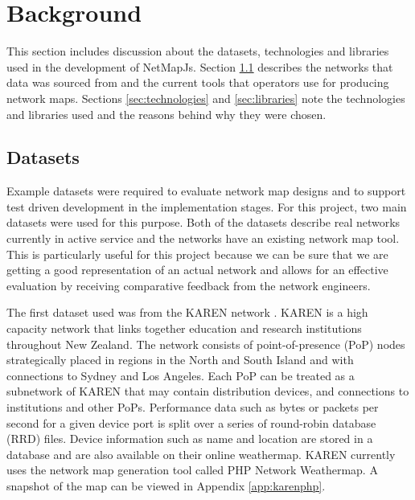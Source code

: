 \documentclass[11pt, a4paper]{article}
\begin{document}
\newpage

\section{Background}
\label{sec:background}

This section includes discussion about the datasets, technologies and libraries
used in the development of NetMapJs. Section \ref{sec:datasets} describes the
networks that data was sourced from and the current tools that operators use for
producing network maps. Sections \ref{sec:technologies} and \ref{sec:libraries}
note the technologies and libraries used and the reasons behind why they were
chosen.

\subsection{Datasets}
\label{sec:datasets}

Example datasets were required to evaluate network map designs and to support
test driven development in the implementation stages. For this project, two main
datasets were used for this purpose. Both of the datasets describe real networks
currently in active service and the networks have an existing network map tool.
This is particularly useful for this project because we can be sure that we are
getting a good representation of an actual network and allows for an effective
evaluation by receiving comparative feedback from the network engineers. 

The first dataset used was from the KAREN network \cite{KAREN_website}. KAREN is
a high capacity network that links together education and research institutions
throughout New Zealand. The network consists of point-of-presence (PoP) nodes
strategically placed in regions in the North and South Island and with
connections to Sydney and Los Angeles. Each PoP can be treated as a subnetwork
of KAREN that may contain distribution devices, and connections to institutions
and other PoPs.  Performance data such as bytes or packets per second for a
given device port is split over a series of round-robin database (RRD) files.
Device information such as name and location are stored in a database and are
also available on their online weathermap. KAREN currently uses the network map
generation tool called PHP Network Weathermap. A snapshot of the map can be
viewed in Appendix \ref{app:karenphp}.
\end{document}
